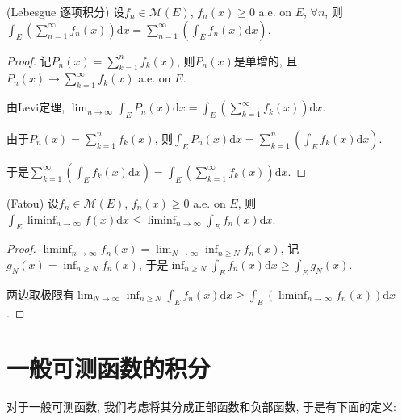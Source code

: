 \documentclass[theorem=false,mathfont=none,openany,sub3section]{easybook}
\begin{document}
\begin{corollary}
  (Lebesgue 逐项积分) 设${f_n}\in \mathcal{M}(E)$, $f_n(x)\geqslant 0$ a.e. on $E$, $\forall n$, 则$\int_{E}\left(\sum_{n=1}^{\infty}f_n(x)\right)\mathrm{d}x = \sum_{n=1}^{\infty}\left(\int_{E}f_n(x)\mathrm{d}x\right)$.\par
\end{corollary}

\begin{proof}
  记$P_n(x)=\sum_{k=1}^{n}f_k(x)$, 则$P_n(x)$是单增的, 且$P_n(x)\rightarrow \sum_{k=1}^{\infty}f_k(x)$ a.e. on $E$.\par
  由Levi定理, $\lim_{n \to \infty}\int_{E}P_n(x)\mathrm{d}x= \int_{E}\left(\sum_{k=1}^{\infty}f_k(x)\right)\mathrm{d}x$.\par
  由于$P_n(x)=\sum_{k=1}^{n}f_k(x)$, 则$\int_{E}P_n(x)\mathrm{d}x=\sum_{k=1}^{n}\left(\int_{E}f_k(x)\mathrm{d}x\right)$.\par
  于是$\sum_{k=1}^{\infty}\left(\int_{E}f_k(x)\mathrm{d}x\right)= \int_{E}\left(\sum_{k=1}^{\infty}f_k(x)\right)\mathrm{d}x$.\par
\end{proof}

\begin{theorem}
  (Fatou) 设${f_n}\in \mathcal{M}(E)$, $f_n(x)\geqslant 0$ a.e. on $E$, 则$\int_{E}\liminf_{n \to \infty}f(x)\mathrm{d}x\leqslant \liminf_{n \to \infty}\int_{E}f_n(x)\mathrm{d}x$.\par
\end{theorem}

\begin{proof}
  $\liminf_{n \to \infty}f_n(x)=\lim_{N \to \infty}\inf_{n\geqslant N}f_n(x)$, 记$g_N(x) = \inf_{n\geqslant N}f_n(x)$, 于是$\inf_{n\geqslant N}\int_{E}f_n(x)\mathrm{d}x\geqslant \int_{E}g_N(x)$.\par
  两边取极限有$\lim_{N \to \infty}\inf_{n\geqslant N}\int_{E}f_n(x)\mathrm{d}x\geqslant \int_{E}\left(\liminf_{n \to \infty}f_n(x)\right)\mathrm{d}x$.\par
\end{proof}

\newpage

\section{一般可测函数的积分}

对于一般可测函数, 我们考虑将其分成正部函数和负部函数, 于是有下面的定义:\par
\end{document}
